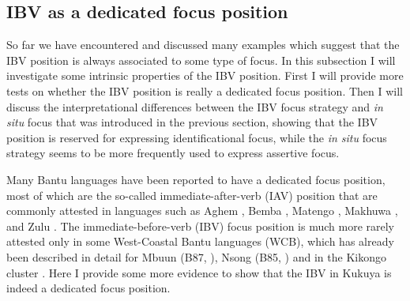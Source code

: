 \documentclass[output=paper,colorlinks,citecolor=brown,
]{langscibook}
\begin{document}
\subsection{IBV as a dedicated focus position}\label{teke:sec:3.3}
So far we have encountered and discussed many examples which suggest that the IBV position is always associated to some type of focus. In this subsection I will investigate some intrinsic properties of the IBV position. First I will provide more tests on whether the IBV position is really a dedicated focus position. Then I will discuss the interpretational differences between the IBV focus strategy and \textit{in situ} focus that was introduced in the previous section, showing that the IBV position is reserved for expressing identificational focus, while the \textit{in situ} focus strategy seems to be more frequently used to express assertive focus.  

Many Bantu languages have been reported to have a dedicated focus position, most of which are the so-called immediate-after-verb (IAV) position that are commonly attested in languages such as Aghem \citep{Watters1979, HymanPolinsky2010}, Bemba \citep{CostaKula2008}, Matengo \citep{Yoneda2011}, Makhuwa \citep{vanderWal2009a}, and Zulu \citep{Buell2009}. The immediate-before-verb (IBV) focus position is much more rarely attested only in some West-Coastal Bantu languages (WCB), which has already been described in detail for Mbuun (B87, \citealt{BostoenMundeke2011, BostoenMundeke2012}), Nsong (B85, \citealt{KoniMuluwaBostoen2019}) and in the Kikongo cluster \citep{Hadermann1996, DeKind2014, DeKindEtAl2015}. Here I provide some more evidence to show that the IBV in Kukuya is indeed a dedicated focus position.
\end{document}
